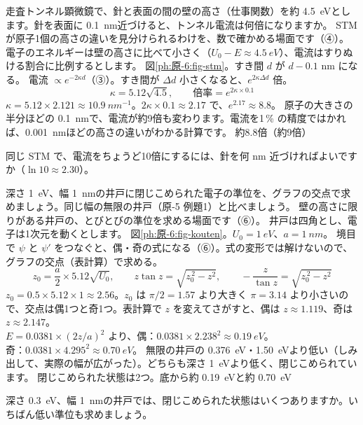 \label{ph:原-6:ex4}
\begin{phreidai}
走査トンネル顕微鏡で、針と表面の間の壁の高さ（仕事関数）を約 \qty{4.5}{eV}とします。針を表面に \qty{0.1}{nm}近づけると、トンネル電流は何倍になりますか。
\phbamen
STM が原子1個の高さの違いを見分けられるわけを、数で確かめる場面です（④）。
\phmushi
電子のエネルギーは壁の高さに比べて小さく（$U_0-E\approx\qty{4.5}{eV}$）、電流はすりぬける割合に比例するとします。
\phzu
図\ref{ph:原-6:fig-stm}。すき間 $d$ が $d-0.1$ nm になる。
\phriyu
電流 $\propto e^{-2\kappa d}$（③）。すき間が $\Delta d$ 小さくなると、$e^{2\kappa\Delta d}$ 倍。
\phtateru
\[\kappa=5.12\sqrt{4.5},\qquad \text{倍率}=e^{2\kappa\times0.1}\]
\phtoku
$\kappa=5.12\times2.121\approx\qty{10.9}{nm^{-1}}$。$2\kappa\times0.1\approx2.17$ で、$e^{2.17}\approx8.8$。
\phtashikame
原子の大きさの半分ほどの \qty{0.1}{nm}で、電流が約9倍も変わります。電流を1\,\% の精度ではかれば、\qty{0.001}{nm}ほどの高さの違いがわかる計算です。
\kotae 約8.8倍（約9倍）
\end{phreidai}
\begin{jibun}
同じ STM で、電流をちょうど10倍にするには、針を何 nm 近づければよいですか（$\ln10\approx2.30$）。
\end{jibun}

\label{ph:原-6:ex5}
\begin{phreidai}[深さ 1 eV・幅 1 nm の井戸]
深さ \qty{1}{eV}、幅 \qty{1}{nm}の井戸に閉じこめられた電子の準位を、グラフの交点で求めましょう。同じ幅の無限の井戸（原-5 例題1）と比べましょう。
\phbamen
壁の高さに限りがある井戸の、とびとびの準位を求める場面です（⑥）。
\phmushi
井戸は四角とし、電子は1次元を動くとします。
\phzu
図\ref{ph:原-6:fig-kouten}。$U_0=\qty{1}{eV}$、$a=\qty{1}{nm}$。
\phriyu
境目で $\psi$ と $\psi'$ をつなぐと、偶・奇の式になる（⑥）。式の変形では解けないので、グラフの交点（表計算）で求める。
\phtateru
\[z_0=\frac a2\times5.12\sqrt{U_0},\qquad z\tan z=\sqrt{z_0^{\,2}-z^2},\qquad -\frac{z}{\tan z}=\sqrt{z_0^{\,2}-z^2}\]
\phtoku
$z_0=0.5\times5.12\times1\approx2.56$。$z_0$ は $\pi/2=1.57$ より大きく $\pi=3.14$ より小さいので、交点は偶1つと奇1つ。表計算で $z$ を変えてさがすと、偶は $z\approx1.119$、奇は $z\approx2.147$。\\
$E=0.0381\times(2z/a)^2$ より、偶：$0.0381\times2.238^2\approx\qty{0.19}{eV}$。\\
奇：$0.0381\times4.295^2\approx\qty{0.70}{eV}$。
\phtashikame
無限の井戸の \qty{0.376}{eV}・\qty{1.50}{eV}より低い（しみ出して、実際の幅が広がった）。どちらも深さ \qty{1}{eV}より低く、閉じこめられています。
\kotae 閉じこめられた状態は2つ。底から約 \qty{0.19}{eV}と約 \qty{0.70}{eV}
\end{phreidai}
\begin{jibun}
深さ \qty{0.3}{eV}、幅 \qty{1}{nm}の井戸では、閉じこめられた状態はいくつありますか。いちばん低い準位も求めましょう。
\end{jibun}

